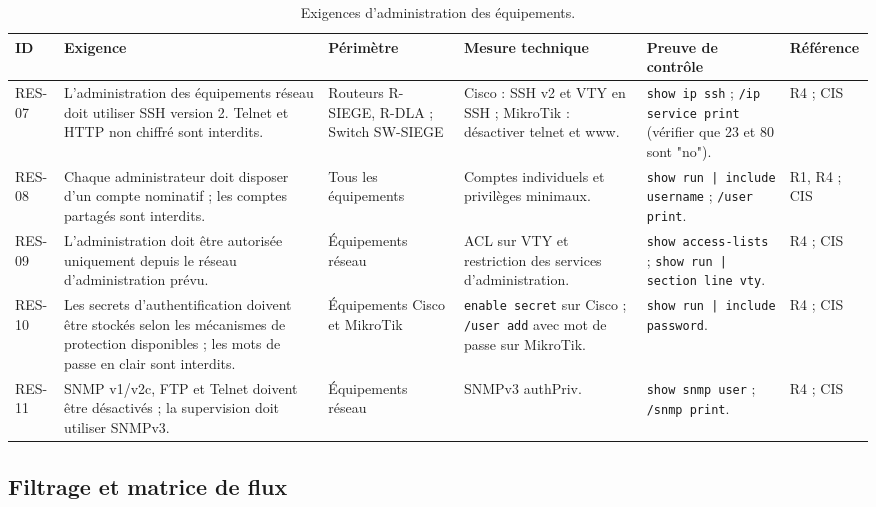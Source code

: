 \documentclass[11pt,a4paper]{article}
\begin{document}
	\scriptsize
	\begin{longtable}{p{0.7cm} p{3.95cm} p{1.95cm} p{3.2cm} p{3.0cm} p{1.8cm}}
		\caption{Exigences d'administration des équipements.}\\
		\hline
		\textbf{ID} & \textbf{Exigence} & \textbf{Périmètre} & \textbf{Mesure technique} & \textbf{Preuve de contrôle} & \textbf{Référence}\\
		\hline
		\endhead
		RES-07 & L'administration des équipements réseau doit utiliser SSH version 2. Telnet et HTTP non chiffré sont interdits. & Routeurs R-SIEGE, R-DLA ; Switch SW-SIEGE & Cisco : SSH v2 et VTY en SSH ; MikroTik : désactiver telnet et www. & \texttt{show ip ssh} ; \texttt{/ip service print} (vérifier que 23 et 80 sont "no"). & R4 ; CIS\\
		\hline
		RES-08 & Chaque administrateur doit disposer d'un compte nominatif ; les comptes partagés sont interdits. & Tous les équipements & Comptes individuels et privilèges minimaux. & \texttt{show run | include username} ; \texttt{/user print}. & R1, R4 ; CIS\\
		\hline
		RES-09 & L'administration doit être autorisée uniquement depuis le réseau d'administration prévu. & Équipements réseau & ACL sur VTY et restriction des services d'administration. & \texttt{show access-lists} ; \texttt{show run | section line vty}. & R4 ; CIS\\
		\hline
		RES-10 & Les secrets d'authentification doivent être stockés selon les mécanismes de protection disponibles ; les mots de passe en clair sont interdits. & Équipements Cisco et MikroTik & \texttt{enable secret} sur Cisco ; \texttt{/user add} avec mot de passe sur MikroTik. & \texttt{show run | include password}. & R4 ; CIS\\
		\hline
		RES-11 & SNMP v1/v2c, FTP et Telnet doivent être désactivés ; la supervision doit utiliser SNMPv3. & Équipements réseau & SNMPv3 authPriv. & \texttt{show snmp user} ; \texttt{/snmp print}. & R4 ; CIS\\
		\hline
	\end{longtable}
	\normalsize
	
	\subsection{Filtrage et matrice de flux}
	
\end{document}
